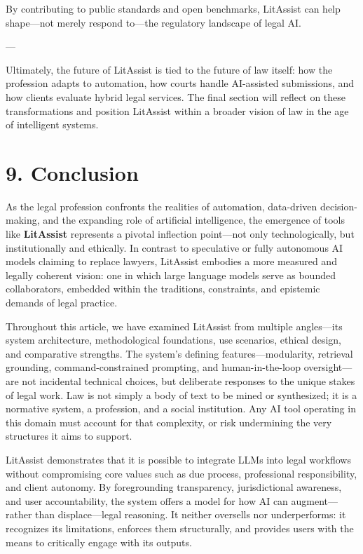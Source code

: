 \documentclass[12pt,a4paper]{article}
\begin{document}
By contributing to public standards and open benchmarks, LitAssist can help shape—not merely respond to—the regulatory landscape of legal AI.

---

Ultimately, the future of LitAssist is tied to the future of law itself: how the profession adapts to automation, how courts handle AI-assisted submissions, and how clients evaluate hybrid legal services. The final section will reflect on these transformations and position LitAssist within a broader vision of law in the age of intelligent systems.


\section*{9. Conclusion}

As the legal profession confronts the realities of automation, data-driven decision-making, and the expanding role of artificial intelligence, the emergence of tools like \textbf{LitAssist} represents a pivotal inflection point—not only technologically, but institutionally and ethically. In contrast to speculative or fully autonomous AI models claiming to replace lawyers, LitAssist embodies a more measured and legally coherent vision: one in which large language models serve as bounded collaborators, embedded within the traditions, constraints, and epistemic demands of legal practice.

Throughout this article, we have examined LitAssist from multiple angles—its system architecture, methodological foundations, use scenarios, ethical design, and comparative strengths. The system's defining features—modularity, retrieval grounding, command-constrained prompting, and human-in-the-loop oversight—are not incidental technical choices, but deliberate responses to the unique stakes of legal work. Law is not simply a body of text to be mined or synthesized; it is a normative system, a profession, and a social institution. Any AI tool operating in this domain must account for that complexity, or risk undermining the very structures it aims to support.

LitAssist demonstrates that it is possible to integrate LLMs into legal workflows without compromising core values such as due process, professional responsibility, and client autonomy. By foregrounding transparency, jurisdictional awareness, and user accountability, the system offers a model for how AI can augment—rather than displace—legal reasoning. It neither oversells nor underperforms: it recognizes its limitations, enforces them structurally, and provides users with the means to critically engage with its outputs.
\end{document}
